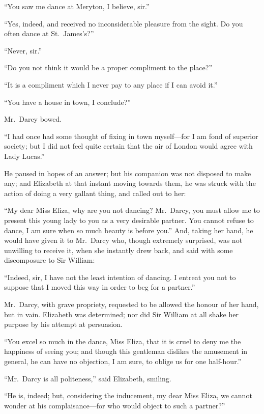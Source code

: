 \documentclass[12pt,english]{book}
\begin{document}
{}``You saw me dance at Meryton, I believe, sir.''

{}``Yes, indeed, and received no inconsiderable pleasure from the
sight. Do you often dance at St.\ James's?''\ 

{}``Never, sir.''

{}``Do you not think it would be a proper compliment to the place?''\ 

{}``It is a compliment which I never pay to any place if I can avoid
it.''

{}``You have a house in town, I conclude?''\ 

Mr.\ Darcy bowed.

{}``I had once had some thought of fixing in town myself\mbox{---}for
I am fond of superior society; but I did not feel quite certain that
the air of London would agree with Lady Lucas.''

He paused in hopes of an answer; but his companion was not disposed
to make any; and Elizabeth at that instant moving towards them, he
was struck with the action of doing a very gallant thing, and called
out to her:

{}``My dear Miss Eliza, why are you not dancing? Mr.\ Darcy, you
must allow me to present this young lady to you as a very desirable
partner. You cannot refuse to dance, I am sure when so much beauty
is before you.'' And, taking her hand, he would have given it to
Mr.\ Darcy who, though extremely surprised, was not unwilling to
receive it, when she instantly drew back, and said with some discomposure
to Sir William:

{}``Indeed, sir, I have not the least intention of dancing. I entreat
you not to suppose that I moved this way in order to beg for a partner.''

Mr.\ Darcy, with grave propriety, requested to be allowed the honour
of her hand, but in vain. Elizabeth was determined; nor did Sir William
at all shake her purpose by his attempt at persuasion.

{}``You excel so much in the dance, Miss Eliza, that it is cruel
to deny me the happiness of seeing you; and though this gentleman
dislikes the amusement in general, he can have no objection, I am
sure, to oblige us for one half-hour.''

{}``Mr.\ Darcy is all politeness,'' said Elizabeth, smiling.

{}``He is, indeed; but, considering the inducement, my dear Miss
Eliza, we cannot wonder at his complaisance\mbox{---}for who would
object to such a partner?''\ 
\end{document}

